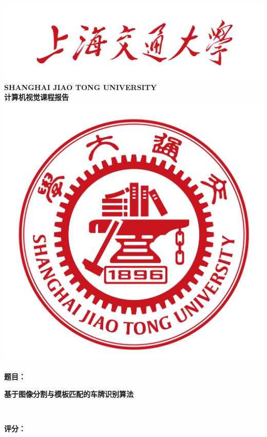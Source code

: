 \documentclass[utf8,a4paper]{ctexart}
\begin{document}
\begin{titlepage}

    \begin{center}

        \includegraphics[width=.9\textwidth]{./img/titlepage1.png}\\[.5cm]

        \textbf{\large SHANGHAI JIAO TONG UNIVERSITY}\\[.5cm]

        \textbf{\kaishu \huge 计算机视觉课程报告}\\[.5cm]

        \includegraphics[width=.2\textwidth]{./img/titlepage2.png}\\[1.5cm]

        \begin{minipage}{0.23\textwidth}
            \begin{flushright} \large
                \textbf{\heiti 题目：}
            \end{flushright}
        \end{minipage}
        \begin{minipage}{0.67\textwidth}
            \begin{flushleft} \large
                \textbf{\heiti 基于图像分割与模板匹配的车牌识别算法}
            \end{flushleft}
        \end{minipage}\\[.5cm]

        \begin{minipage}{0.23\textwidth}
            \begin{flushright} \large
                \textbf{\heiti 评分：}
            \end{flushright}
        \end{minipage}
        \begin{minipage}{0.67\textwidth}
            \begin{flushleft} \large
                \textbf{\heiti }
            \end{flushleft}
        \end{minipage}\\[1.5cm]


\end{center}
\end{titlepage}
\end{document}

